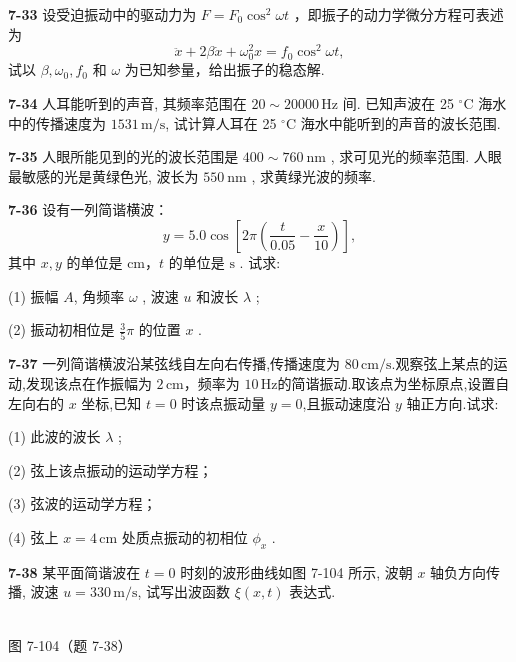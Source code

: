 \newpage

\textbf{7-33} 设受迫振动中的驱动力为 $F = F_{0} \cos^{2} \omega t$ ，即振子的动力学微分方程可表述为
\[
\ddot {x} + 2 \beta \dot {x} + \omega_ {0} ^ {2} x = f _ {0} \cos^ {2} \omega t,
\]
试以 $\beta, \omega_0, f_0$ 和 $\omega$ 为已知参量，给出振子的稳态解.

\newpage

\textbf{7-34} 人耳能听到的声音, 其频率范围在 $20\sim20000\,\mathrm{Hz}$ 间. 已知声波在 25 $^\circ\mathrm C$ 海水中的传播速度为 $1531\,\mathrm{m/s}$, 试计算人耳在 25 $^\circ\mathrm C$ 海水中能听到的声音的波长范围.

\newpage

\textbf{7-35} 人眼所能见到的光的波长范围是 $400 \sim 760 \mathrm{~nm}$ , 求可见光的频率范围. 人眼最敏感的光是黄绿色光, 波长为 $550 \mathrm{~nm}$ , 求黄绿光波的频率.

\newpage

\textbf{7-36} 设有一列简谐横波：
\[
y = 5.0\cos\left[2\pi\left(\frac{t}{0.05}-\frac{x}{10}\right)\right],
\]
其中 $x,y$ 的单位是 $\mathrm{cm}$，$t$ 的单位是 $\mathrm s$ . 试求:

(1) 振幅 $A$, 角频率 $\omega$ , 波速 $u$ 和波长 $\lambda$ ;

(2) 振动初相位是 $\frac{3}{5}\pi$ 的位置 $x$ .

\newpage

\textbf{7-37} 一列简谐横波沿某弦线自左向右传播,传播速度为 $80\,\mathrm{cm/s}$.观察弦上某点的运动,发现该点在作振幅为 $2\,\mathrm{cm}$，频率为 $10\,\mathrm{Hz}$的简谐振动.取该点为坐标原点,设置自左向右的 $x$ 坐标,已知 $t=0$ 时该点振动量 $y=0$,且振动速度沿 $y$ 轴正方向.试求:

(1) 此波的波长 $\lambda$ ;

(2) 弦上该点振动的运动学方程；

(3) 弦波的运动学方程；

(4) 弦上 $x=4\,\mathrm{cm}$ 处质点振动的初相位 $\phi_{x}$ .

\newpage

\textbf{7-38} 某平面简谐波在 $t=0$ 时刻的波形曲线如图 7-104 所示, 波朝 $x$ 轴负方向传播, 波速 $u=330\,\mathrm{m/s}$, 试写出波函数 $\xi(x,t)$ 表达式.

\begin{center}
\resizebox{0.50\textwidth}{!}{}\\[4pt]
{\small 图 7-104（题 7-38）}
\end{center}

